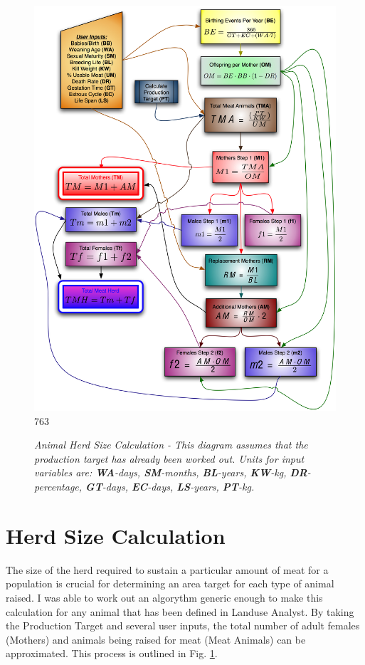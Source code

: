 \begin{figure}[htbp]
    \includegraphics[scale=.4]{./images/animalHerdSize.jpg}
763
    \caption[Animal Herd Size Calculation]{\label{fig:herdSize}\textit{Animal
Herd Size Calculation - This diagram assumes that the production target has
already been worked out.  Units for input variables are: \textbf{WA}-days,
\textbf{SM}-months, \textbf{BL}-years, \textbf{KW}-kg, \textbf{DR}-percentage,
\textbf{GT}-days, \textbf{EC}-days, \textbf{LS}-years, \textbf{PT}-kg.}}
\end{figure}

\section{Herd Size Calculation}
The size of the herd required to sustain a particular amount of meat for a
population is crucial for determining an area target for each type of animal
raised.  I was able to work out an algorythm generic enough to make this
calculation for any animal that has been defined in Landuse Analyst.  By taking
the Production Target and several user inputs, the total number of adult females
(Mothers) and animals being raised for meat (Meat Animals) can be approximated. 
This process is outlined in Fig. \ref{fig:herdSize}.

